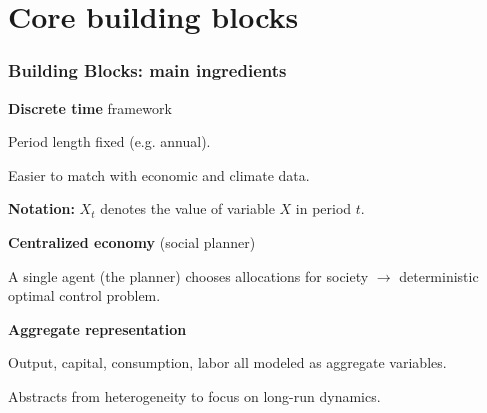 \documentclass[xcolor=x11names,compress,aspectratio=169]{beamer}%
\makeatletter
\renewenvironment{itemize}{\begin{compactitemize}[<+-| alert@+>]}{\end{compactitemize}}
\makeatother
\begin{document}
\section{Core building blocks}%

\begin{frame}%
%

\frametitle{Building Blocks: main ingredients}%


\begin{itemize}
\item \textbf{Discrete time} framework

\begin{itemize}
\item Period length fixed (e.g. annual).

\item Easier to match with economic and climate data.
\end{itemize}

\vspace{0.3cm}

\item \textbf{Notation:} $X_{t}$ denotes the value of variable $X$ in period
$t$. \vspace{0.3cm}

\item \textbf{Centralized economy} (social planner)

\begin{itemize}
\item A single agent (the planner) chooses allocations for society
$\rightarrow$ deterministic optimal control problem.
\end{itemize}

\vspace{0.3cm}

\item \textbf{Aggregate representation}

\begin{itemize}
\item Output, capital, consumption, labor all modeled as aggregate variables.

\item Abstracts from heterogeneity to focus on long-run dynamics.
\end{itemize}
\end{itemize}

%

\transboxout
\end{frame}%
%
\end{document}
